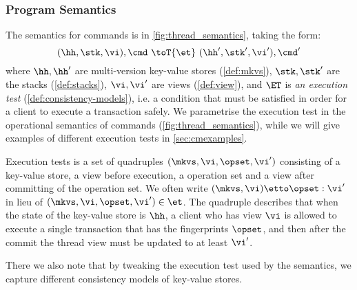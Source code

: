 \subsubsection{Program Semantics}
\label{sec:prog-semantics}

The semantics for commands is in \cref{fig:thread_semantics}, taking the form:
\[
    ( \hh, \stk, \vi ), \cmd \ \toT{\et} \ ( \hh', \stk', \vi' ) , \cmd'
\]
where \( \hh, \hh' \) are multi-version key-value stores (\cref{def:mkvs}), \( \stk, \stk'\) are the stacks (\cref{def:stacks}), \( \vi, \vi'\) are views (\cref{def:view}), and $\ET$ is \emph{an execution test} (\cref{def:consistency-models}), i.e. a condition that must be satisfied in order for a client to execute a transaction safely. 
We parametrise the execution test in the operational semantics of commands (\cref{fig:thread_semantics}), while we will give examples of different execution tests in \cref{sec:cmexamples}. 

Execution tests is a set of quadruples \( (\mkvs, \vi, \opset, \vi') \) consisting of a key-value store, a view before execution, a operation set and a view after committing of the operation set. 
We often write \( (\mkvs, \vi) \etto \opset : \vi'\) in lieu of \( (\mkvs, \vi, \opset, \vi') \in \et\).
The quadruple describes that when the state of the key-value store is \( \hh \), a client who has view \( \vi \) is allowed to execute a single transaction that has  the fingerprints \( \opset \), and then after the commit the thread view must be updated to at least \( \vi' \).

\ac{
There we also note that by tweaking the execution test used by the 
semantics, we capture different consistency models of 
key-value stores.
}

